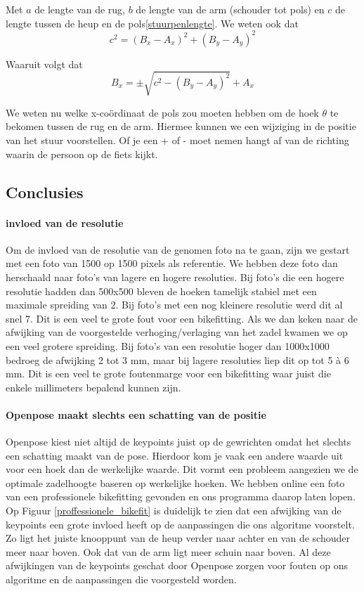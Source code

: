 \documentclass[a4paper,twoside,kulak]{kulakreport}
\begin{document}
Met \(a\) de lengte van de rug, \(b\) de lengte van de arm (schouder tot pols) en \(c\) de lengte tussen de heup en de pols\ref{stuurpenlengte}. We weten ook dat
\[c^2 = (B_x - A_x)^2 + (B_y - A_y)^2\]

Waaruit volgt dat
\[B_x = \pm \sqrt{c^2 -(B_y - A_y)^2 } + A_x\]

We weten nu welke x-coördinaat de pols zou moeten hebben om de hoek $\theta$ te bekomen tussen de rug en de arm. Hiermee kunnen we een wijziging in de positie van het stuur voorstellen. Of je een + of - moet nemen hangt af van de richting waarin de persoon op de fiets kijkt.

\subsection{Conclusies}

\paragraph{invloed van de resolutie}
Om de invloed van de resolutie van de genomen foto na te gaan, zijn we gestart met een foto van 1500 op 1500 pixels als referentie. We hebben deze foto dan herschaald naar foto's van lagere en hogere resoluties. Bij foto's die een hogere resolutie hadden dan 500x500 bleven de hoeken tamelijk stabiel met een maximale spreiding van 2\degree. Bij foto's met een nog kleinere resolutie werd dit al snel 7\degree. Dit is een veel te grote fout voor een bikefitting. Als we dan keken naar de afwijking van de voorgestelde verhoging/verlaging van het zadel kwamen we op een veel grotere spreiding. Bij foto's van een resolutie hoger dan 1000x1000 bedroeg de afwijking 2 tot 3 \si{mm}, maar bij lagere resoluties liep dit op tot 5 à 6 \si{mm}. Dit is een veel te grote foutenmarge voor een bikefitting waar juist die enkele millimeters bepalend kunnen zijn.

\paragraph{Openpose maakt slechts een schatting van de positie}
Openpose kiest niet altijd de keypoints juist op de gewrichten omdat het slechts een schatting maakt van de pose. Hierdoor kom je vaak een andere waarde uit voor een hoek dan de werkelijke waarde. Dit vormt een probleem aangezien we de optimale zadelhoogte baseren op werkelijke hoeken. We hebben online een foto van een professionele bikefitting gevonden en ons programma daarop laten lopen. Op Figuur \ref{proffessionele_bikefit} is duidelijk te zien dat een afwijking van de keypoints een grote invloed heeft op de aanpassingen die ons algoritme voorstelt. Zo ligt het juiste knooppunt van de heup verder naar achter en van de schouder meer naar boven. Ook dat van de arm ligt meer schuin naar boven. Al deze afwijkingen van de keypoints geschat door Openpose zorgen voor fouten op ons algoritme en de aanpassingen die voorgesteld worden.
\end{document}
